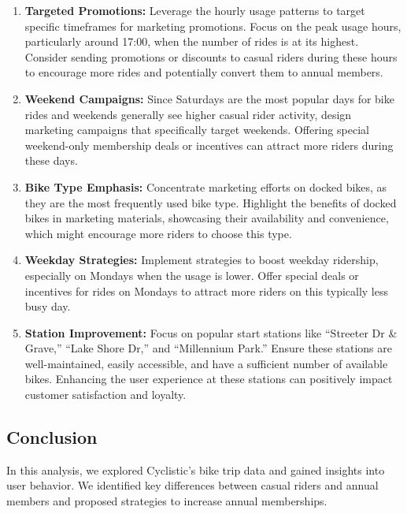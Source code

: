 \documentclass[
]{article}
\begin{document}
\begin{enumerate}
\def\labelenumi{\arabic{enumi}.}
\item
  \textbf{Targeted Promotions:} Leverage the hourly usage patterns to
  target specific timeframes for marketing promotions. Focus on the peak
  usage hours, particularly around 17:00, when the number of rides is at
  its highest. Consider sending promotions or discounts to casual riders
  during these hours to encourage more rides and potentially convert
  them to annual members.
\item
  \textbf{Weekend Campaigns:} Since Saturdays are the most popular days
  for bike rides and weekends generally see higher casual rider
  activity, design marketing campaigns that specifically target
  weekends. Offering special weekend-only membership deals or incentives
  can attract more riders during these days.
\item
  \textbf{Bike Type Emphasis:} Concentrate marketing efforts on docked
  bikes, as they are the most frequently used bike type. Highlight the
  benefits of docked bikes in marketing materials, showcasing their
  availability and convenience, which might encourage more riders to
  choose this type.
\item
  \textbf{Weekday Strategies:} Implement strategies to boost weekday
  ridership, especially on Mondays when the usage is lower. Offer
  special deals or incentives for rides on Mondays to attract more
  riders on this typically less busy day.
\item
  \textbf{Station Improvement:} Focus on popular start stations like
  ``Streeter Dr \& Grave,'' ``Lake Shore Dr,'' and ``Millennium Park.''
  Ensure these stations are well-maintained, easily accessible, and have
  a sufficient number of available bikes. Enhancing the user experience
  at these stations can positively impact customer satisfaction and
  loyalty.
\end{enumerate}

\hypertarget{conclusion}{%
\subsection{Conclusion}\label{conclusion}}

In this analysis, we explored Cyclistic's bike trip data and gained
insights into user behavior. We identified key differences between
casual riders and annual members and proposed strategies to increase
annual memberships.
\end{document}
